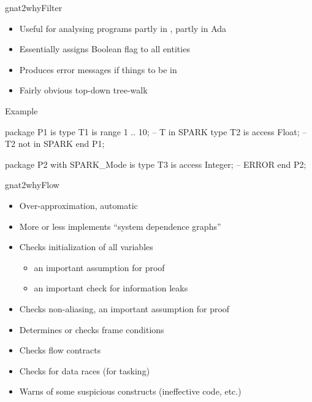 \documentclass{beamer}
\begin{document}
\begin{frame}[fragile]{gnat2why}{Filter}
  \begin{itemize}
  \item Useful for analysing programs partly in \spark, partly in Ada
  \item Essentially assigns Boolean flag to all entities
  \item Produces error messages if things  to be in
    \spark
  \item Fairly obvious top-down tree-walk
  \end{itemize}
  \begin{block}{Example}
    \begin{pxcode}[language=SPARK,gobble=6]
      package P1 is
         type T1 is range 1 .. 10;  -- T in SPARK
         type T2 is access Float;   -- T2 not in SPARK
      end P1;

      package P2 with SPARK_Mode is
         type T3 is access Integer; -- ERROR
      end P2;
    \end{pxcode}
  \end{block}
\end{frame}

\begin{frame}{gnat2why}{Flow}
  \begin{itemize}
  \item Over-approximation, automatic
  \item More or less implements ``system dependence graphs''
  \item Checks initialization of all variables
    \begin{itemize}
    \item an important assumption for proof
    \item an important check for information leaks
    \end{itemize}
  \item Checks non-aliasing, an important assumption for proof
  \item Determines or checks frame conditions
  \item Checks flow contracts
  \item Checks for data races (for tasking)
  \item Warns of some suspicious constructs (ineffective code, etc.)
  \end{itemize}
\end{frame}
\end{document}
